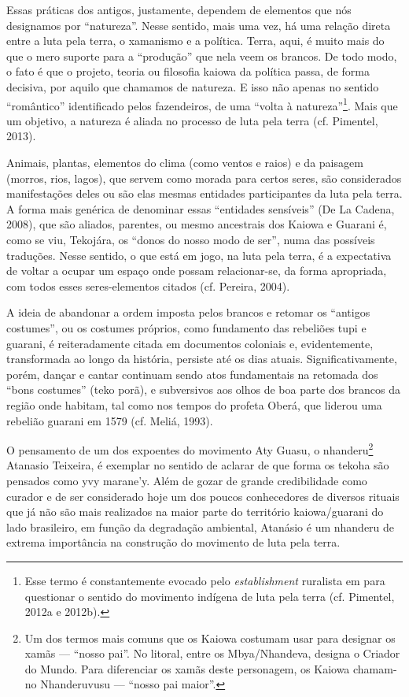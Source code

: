 Essas práticas dos antigos, justamente, dependem de elementos que nós
designamos por ``natureza''. Nesse sentido, mais uma vez, há uma relação
direta entre a luta pela terra, o xamanismo e a política. Terra, aqui,
é muito mais do que o mero suporte para a ``produção'' que nela veem os
brancos. De todo modo, o fato é que o projeto, teoria ou filosofia
kaiowa da política passa, de forma decisiva, por aquilo que chamamos de
natureza. E isso não apenas no sentido ``romântico'' identificado pelos
fazendeiros, de uma ``volta à natureza''\footnote{Esse termo é
constantemente evocado pelo \emph{establishment} ruralista em  para
questionar o sentido do movimento indígena de luta pela terra (cf.
Pimentel, 2012a e 2012b).}. Mais que um objetivo, a natureza é aliada
no processo de luta pela terra (cf. Pimentel, 2013).

Animais, plantas, elementos do clima (como ventos e raios) e da paisagem
(morros, rios, lagos), que servem como morada para certos seres, são
considerados manifestações deles ou são elas mesmas entidades
participantes da luta pela terra. A forma mais genérica de denominar
essas ``entidades sensíveis'' (De La Cadena, 2008), que são aliados,
parentes, ou mesmo ancestrais dos Kaiowa e Guarani é, como se viu,
Tekojára, os ``donos do nosso modo de ser'', numa das possíveis
traduções. Nesse sentido, o que está em jogo, na luta pela terra, é a
expectativa de voltar a ocupar um espaço onde possam relacionar-se, da
forma apropriada, com todos esses seres-elementos citados (cf. Pereira,
2004).

A ideia de abandonar a ordem imposta pelos brancos e retomar os ``antigos
costumes'', ou os costumes próprios, como fundamento das rebeliões tupi
e guarani, é reiteradamente citada em documentos coloniais e,
evidentemente, transformada ao longo da história, persiste até os dias
atuais. Significativamente, porém, dançar e cantar continuam sendo atos
fundamentais na retomada dos ``bons costumes'' (teko porã), e subversivos
aos olhos de boa parte dos brancos da região onde habitam, tal como nos
tempos do profeta Oberá, que liderou uma rebelião guarani em 1579 (cf.
Meliá, 1993).

O pensamento de um dos expoentes do movimento Aty Guasu, o
nhanderu\footnote{Um dos termos mais comuns que os Kaiowa costumam usar
para designar os xamãs --- ``nosso pai''. No litoral, entre os
Mbya/Nhandeva, designa o Criador do Mundo. Para diferenciar os xamãs
deste personagem, os Kaiowa chamam-no Nhanderuvusu --- ``nosso pai
maior''.} Atanasio Teixeira, é exemplar no sentido de aclarar de que
forma os tekoha são pensados como yvy marane’y. Além de gozar de grande
credibilidade como curador e de ser considerado hoje um dos poucos
conhecedores de diversos rituais que já não são mais realizados na
maior parte do território kaiowa/guarani do lado brasileiro, em função
da degradação ambiental, Atanásio é um nhanderu de extrema importância
na construção do movimento de luta pela terra. 

